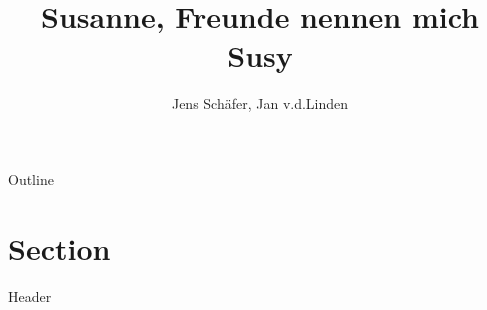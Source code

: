 \documentclass[18pt]{beamer}
\title[SUSY]{Susanne, Freunde nennen mich Susy}
\author{Jens Schäfer, Jan v.d.Linden}
\institute{Institut für Experimentelle Teilchenphysik (ETP)}
\begin{document}
\begin{frame}
\titlepage
\end{frame}





\begin{frame}{Outline}
\tableofcontents
\end{frame}



\section{Section}
\begin{frame}{Header}

\end{frame}
\end{document}
